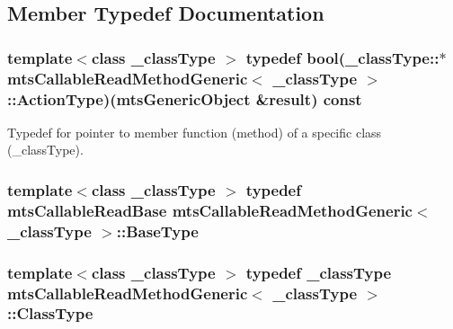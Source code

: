 \subsection{Member Typedef Documentation}
\hypertarget{classmts_callable_read_method_generic_adb570e75fc2af331a2cc2b8e6104b959}{
\subsubsection[{Action\-Type}]{\setlength{\rightskip}{0pt plus 5cm}template$<$class \-\_\-class\-Type $>$ typedef bool(\-\_\-class\-Type\-::$\ast$ {\bf mts\-Callable\-Read\-Method\-Generic}$<$ \-\_\-class\-Type $>$\-::Action\-Type)({\bf mts\-Generic\-Object} \&result) const }}\label{classmts_callable_read_method_generic_adb570e75fc2af331a2cc2b8e6104b959}
Typedef for pointer to member function (method) of a specific class (\-\_\-class\-Type). \hypertarget{classmts_callable_read_method_generic_ade696274218351d03e90dd1d7609d575}{
\subsubsection[{Base\-Type}]{\setlength{\rightskip}{0pt plus 5cm}template$<$class \-\_\-class\-Type $>$ typedef {\bf mts\-Callable\-Read\-Base} {\bf mts\-Callable\-Read\-Method\-Generic}$<$ \-\_\-class\-Type $>$\-::{\bf Base\-Type}}}\label{classmts_callable_read_method_generic_ade696274218351d03e90dd1d7609d575}
\hypertarget{classmts_callable_read_method_generic_afa0ef401d0f5538af2f0fe114ad9202d}{
\subsubsection[{Class\-Type}]{\setlength{\rightskip}{0pt plus 5cm}template$<$class \-\_\-class\-Type $>$ typedef \-\_\-class\-Type {\bf mts\-Callable\-Read\-Method\-Generic}$<$ \-\_\-class\-Type $>$\-::{\bf Class\-Type}}}\label{classmts_callable_read_method_generic_afa0ef401d0f5538af2f0fe114ad9202d}
